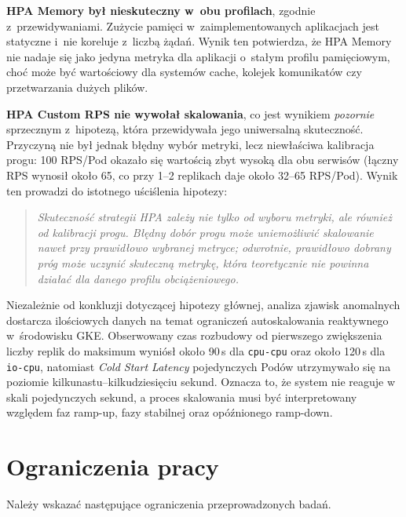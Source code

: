 \textbf{HPA Memory był nieskuteczny w~obu profilach}, zgodnie z~przewidywaniami. Zużycie pamięci w~zaimplementowanych aplikacjach jest statyczne i~nie koreluje z~liczbą żądań. Wynik ten potwierdza, że HPA Memory nie nadaje się jako jedyna metryka dla aplikacji o~stałym profilu pamięciowym, choć może być wartościowy dla systemów cache, kolejek komunikatów czy przetwarzania dużych plików.

\textbf{HPA Custom RPS nie wywołał skalowania}, co jest wynikiem \textit{pozornie} sprzecznym z~hipotezą, która przewidywała jego uniwersalną skuteczność. Przyczyną nie był jednak błędny wybór metryki, lecz niewłaściwa kalibracja progu: 100 RPS/Pod okazało się wartością zbyt wysoką dla obu serwisów (łączny RPS wynosił około 65, co przy 1--2 replikach daje około 32--65 RPS/Pod). Wynik ten prowadzi do istotnego uściślenia hipotezy:

\begin{quote}
\textit{Skuteczność strategii HPA zależy nie tylko od wyboru metryki, ale również od kalibracji progu. Błędny dobór progu może uniemożliwić skalowanie nawet przy prawidłowo wybranej metryce; odwrotnie, prawidłowo dobrany próg może uczynić skuteczną metrykę, która teoretycznie nie powinna działać dla danego profilu obciążeniowego.}
\end{quote}

Niezależnie od konkluzji dotyczącej hipotezy głównej, analiza zjawisk anomalnych dostarcza ilościowych danych na temat ograniczeń autoskalowania reaktywnego w~środowisku GKE. Obserwowany czas rozbudowy od pierwszego zwiększenia liczby replik do maksimum wyniósł około 90\,s dla \texttt{cpu-cpu} oraz około 120\,s dla \texttt{io-cpu}, natomiast \textit{Cold Start Latency} pojedynczych Podów utrzymywało się na poziomie kilkunastu--kilkudziesięciu sekund. Oznacza to, że system nie reaguje w skali pojedynczych sekund, a proces skalowania musi być interpretowany względem faz ramp-up, fazy stabilnej oraz opóźnionego ramp-down.

\section{Ograniczenia pracy}

Należy wskazać następujące ograniczenia przeprowadzonych badań.

